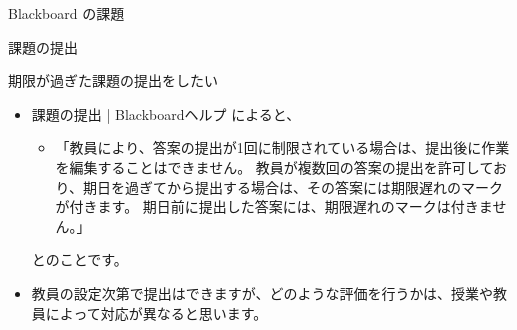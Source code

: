 \documentclass[a4j,10pt]{jsarticle}
\def\lthtmlcheckvsize{\ifdim\ht\sizebox<\vsize 
  \ifdim\wd\sizebox<\hsize\expandafter\hfill\fi \expandafter\vfill
  \else\expandafter\vss\fi}%
\begin{document}
{\begin{frame}[label={sec:org6cf18dd},fragile]{Blackboard の課題}
\begin{block}{課題の提出}
\begin{block}{期限が過ぎた課題の提出をしたい}
\begin{itemize}
\item 課題の提出 | Blackboardヘルプ によると、
\begin{itemize}
\item 「教員により、答案の提出が1回に制限されている場合は、提出後に作業を編集することはできません。
教員が複数回の答案の提出を許可しており、期日を過ぎてから提出する場合は、その答案には期限遅れのマークが付きます。
期日前に提出した答案には、期限遅れのマークは付きません。」
\end{itemize}
とのことです。
\item 教員の設定次第で提出はできますが、どのような評価を行うかは、授業や教員によって対応が異なると思います。
\end{itemize}
\end{block}
\end{block}
\end{frame}%
\lthtmlfigureZ
\lthtmlcheckvsize\clearpage}
\end{document}
